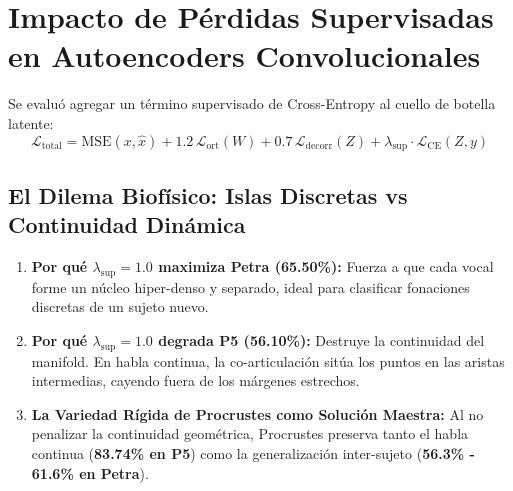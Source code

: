 \documentclass[11pt,a4paper,openany]{book}
\theoremstyle{definition}
\begin{document}
\section{Impacto de Pérdidas Supervisadas en Autoencoders Convolucionales}
\label{sec:perdida_supervisada}

Se evaluó agregar un término supervisado de Cross-Entropy al cuello de botella latente:
$$\mathcal{L}_{\text{total}} = \text{MSE}(x, \hat{x}) + 1.2 \, \mathcal{L}_{\text{ort}}(W) + 0.7 \, \mathcal{L}_{\text{decorr}}(Z) + \lambda_{\text{sup}} \cdot \mathcal{L}_{\text{CE}}(Z, y)$$

\begin{table}[H]
\centering
\small
{}
\caption{Comparativa sistemática variando la intensidad de la regularización supervisada.}
\label{tab:lambda_sup}
\end{table}

\subsection{El Dilema Biofísico: Islas Discretas vs Continuidad Dinámica}
\begin{enumerate}
    \item \textbf{Por qué $\lambda_{\text{sup}} = 1.0$ maximiza Petra (65.50\%):} Fuerza a que cada vocal forme un núcleo hiper-denso y separado, ideal para clasificar fonaciones discretas de un sujeto nuevo.
    \item \textbf{Por qué $\lambda_{\text{sup}} = 1.0$ degrada P5 (56.10\%):} Destruye la continuidad del manifold. En habla continua, la co-articulación sitúa los puntos en las aristas intermedias, cayendo fuera de los márgenes estrechos.
    \item \textbf{La Variedad Rígida de Procrustes como Solución Maestra:} Al no penalizar la continuidad geométrica, Procrustes preserva tanto el habla continua (\textbf{83.74\% en P5}) como la generalización inter-sujeto (\textbf{56.3\% - 61.6\% en Petra}).
\end{enumerate}
\end{document}
